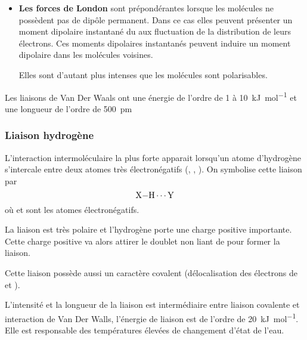 \documentclass{cours}
\begin{document}
\begin{itemize}
  \item \textbf{Les forces de London} sont prépondérantes lorsque les molécules ne possèdent pas de dipôle permanent. Dans ce cas elles peuvent présenter un moment dipolaire instantané du aux fluctuation de la distribution de leurs électrons. Ces moments dipolaires instantanés peuvent induire un moment dipolaire dans les molécules voisines.
  \begin{center}
  \end{center}

  Elles sont d'autant plus intenses que les molécules sont polarisables.
\end{itemize}


Les liaisons de Van Der Waals ont une énergie de l'ordre de 1 à \SI{10}{kJ\per\mol} et une longueur de l'ordre de \SI{500}{pm}

\subsubsection{Liaison hydrogène}%
\label{ssub:liaison_hydrogene}

L'interaction intermoléculaire la plus forte apparait lorsqu'un atome d'hydrogène s'intercale entre deux atomes très électronégatifs (, , ). On symbolise cette liaison par 
\begin{equation*}
  \ce{X-H \cdots Y}
\end{equation*}
où  et  sont les atomes électronégatifs.

La liaison  est très polaire et l'hydrogène porte une charge positive importante. Cette charge positive va alors attirer le doublet non liant de  pour former la liaison.

Cette liaison possède aussi un caractère covalent (délocalisation des électrons de  et ). 

L'intensité et la longueur de la liaison est intermédiaire entre liaison covalente et interaction de Van Der Walls, l'énergie de liaison est de l'ordre de \SI{20}{\kilo\joule\per\mol}. Elle est responsable des températures élevées de changement d'état de l'eau.
\end{document}
